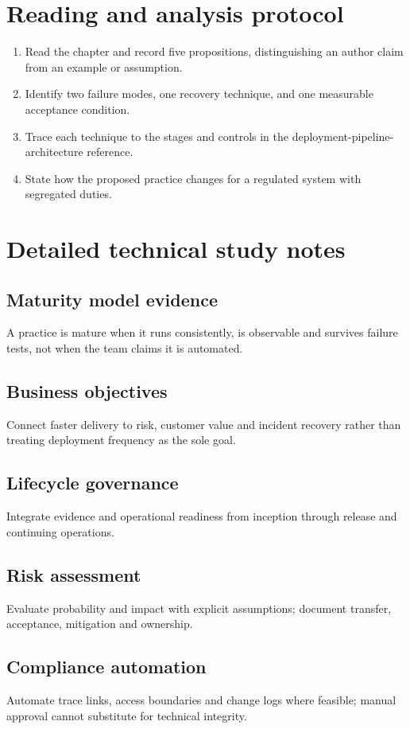 \documentclass[10pt,letterpaper]{article}
\begin{document}
\section{Reading and analysis protocol}
\begin{enumerate}
\item Read the chapter and record five propositions, distinguishing an author claim from an example or assumption.
\item Identify two failure modes, one recovery technique, and one measurable acceptance condition.
\item Trace each technique to the stages and controls in the deployment-pipeline-architecture reference.
\item State how the proposed practice changes for a regulated system with segregated duties.
\end{enumerate}

\section{Detailed technical study notes}
\subsection{Maturity model evidence}
A practice is mature when it runs consistently, is observable and survives failure tests, not when the team claims it is automated.

\subsection{Business objectives}
Connect faster delivery to risk, customer value and incident recovery rather than treating deployment frequency as the sole goal.

\subsection{Lifecycle governance}
Integrate evidence and operational readiness from inception through release and continuing operations.

\subsection{Risk assessment}
Evaluate probability and impact with explicit assumptions; document transfer, acceptance, mitigation and ownership.

\subsection{Compliance automation}
Automate trace links, access boundaries and change logs where feasible; manual approval cannot substitute for technical integrity.
\end{document}
